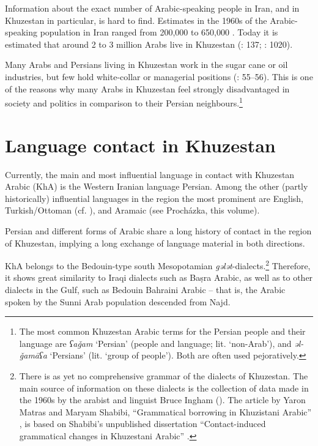 \documentclass[output=paper,nonflat]{langsci/langscibook}
\begin{document}
Information about the exact number of Arabic-speaking people in Iran, and in Khuzestan in particular, is hard to find. Estimates in the 1960s of the Arabic-speaking population in Iran ranged from 200,000 to 650,000 \citep[216]{Oberling1986}. Today it is estimated that around 2 to 3 million Arabs live in Khuzestan (\citealt{MatrasShabibi2007}: 137; \citealt{Gazsi2011}: 1020). 

Many Arabs and Persians living in Khuzestan work in the sugar cane or oil industries, but few hold white-collar or managerial positions (\citealt{DePlanhol1986}: 55–56). This is one of the reasons why many Arabs in Khuzestan feel strongly disadvantaged in society and politics in comparison to their Persian neighbours.\footnote{The most common Khuzestan Arabic terms for the Persian people and their language are \textit{ʕaǧam} ‘Persian' (people and language; lit. `non-Arab'), and \textit{əl-ǧamāʕa} ‘Persians’ (lit. `group of people'). Both are often used pejoratively.} 

\section{Language contact in Khuzestan}

Currently, the main and most influential language in contact with Khuzestan Arabic (KhA) is the Western Iranian language Persian. Among the other (partly historically) influential languages in the region the most prominent are English, Turkish/Ottoman (cf. \citealt{Ingham2005}), and Aramaic (see Procházka, this volume).

Persian and different forms of Arabic share a long history of contact in the region of Khuzestan, implying a long exchange of language material in both directions. 

KhA belongs to the Bedouin-type south Mesopotamian \textit{gələt}-dialects.\footnote{There is as yet no comprehensive grammar of the dialects of Khuzestan. The main source of information on these dialects is the collection of data made in the 1960s by the arabist and linguist Bruce Ingham (\citeyear{Ingham1973,Ingham1976,Ingham2011khuz}). The article by Yaron Matras and Maryam Shabibi, “Grammatical borrowing in Khuzistani Arabic” \citep{MatrasShabibi2007}, is based on Shabibi’s unpublished dissertation “Contact-induced grammatical changes in Khuzestani Arabic” \citep{Shabibi2006}.} Therefore, it shows great similarity to Iraqi dialects such as Baṣra Arabic, as well as to other dialects in the Gulf, such as Bedouin Bahraini Arabic – that is, the Arabic spoken by the Sunni Arab population descended from Najd. 
\end{document}
